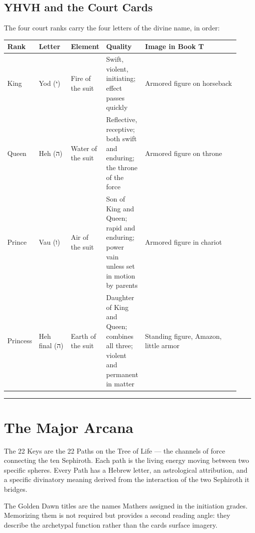 \subsection{YHVH and the Court Cards}\label{yhvh-and-the-court-cards}

The four court ranks carry the four letters of the divine name, in order:

\begin{longtable}[]{@{}>{\RaggedRight\small}p{0.10\linewidth}>{\RaggedRight\small}p{0.14\linewidth}>{\RaggedRight\small}p{0.12\linewidth}>{\RaggedRight\small}p{0.14\linewidth}>{\RaggedRight\small}p{0.44\linewidth}@{}}
\toprule\noalign{}
Rank & Letter & Element & Quality & Image in Book T \\
\midrule\noalign{}
\endhead
\bottomrule\noalign{}
\endlastfoot
King & Yod (י) & Fire of the suit & Swift, violent, initiating; effect passes quickly & Armored figure on horseback \\
Queen & Heh (ה) & Water of the suit & Reflective, receptive; both swift and enduring; the throne of the force & Armored figure on throne \\
Prince & Vau (ו) & Air of the suit & Son of King and Queen; rapid and enduring; power vain unless set in motion by parents & Armored figure in chariot \\
Princess & Heh final (ה) & Earth of the suit & Daughter of King and Queen; combines all three; violent and permanent in matter & Standing figure, Amazon, little armor \\
\end{longtable}

\begin{center}\rule{0.5\linewidth}{0.5pt}\end{center}

\section{The Major Arcana}\label{the-major-arcana}

The 22 Keys are the 22 Paths on the Tree of Life --- the channels of force connecting the ten Sephiroth. Each path is the living energy moving between two specific spheres. Every Path has a Hebrew letter, an astrological attribution, and a specific divinatory meaning derived from the interaction of the two Sephiroth it bridges.

The Golden Dawn titles are the names Mathers assigned in the initiation grades. Memorizing them is not required but provides a second reading angle: they describe the archetypal function rather than the card\textquotesingle s surface imagery.

